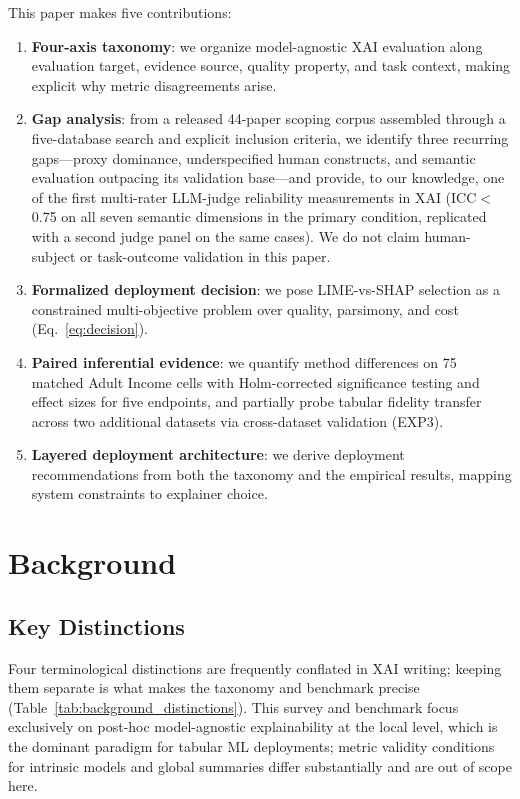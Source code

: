 \documentclass[fleqn,10pt,lineno]{wlpeerj}
\begin{document}
This paper makes five contributions:
\begin{enumerate}[leftmargin=*]
\item \textbf{Four-axis taxonomy}: we organize model-agnostic XAI
evaluation along evaluation target, evidence source, quality property,
and task context, making explicit why metric disagreements arise.
\item \textbf{Gap analysis}: from a released 44-paper scoping corpus
assembled through a five-database search and explicit inclusion criteria,
we identify three recurring gaps---proxy dominance, underspecified human constructs, and semantic
evaluation outpacing its validation base---and provide, to our
knowledge, one of the first multi-rater LLM-judge reliability measurements in
XAI (ICC$<$0.75 on all seven semantic dimensions in the primary condition,
replicated with a second judge panel on the same cases). We do not claim
human-subject or task-outcome validation in this paper.
\item \textbf{Formalized deployment decision}: we pose LIME-vs-SHAP
selection as a constrained multi-objective problem over quality, parsimony,
and cost (Eq.~\ref{eq:decision}).
\item \textbf{Paired inferential evidence}: we quantify method differences
on 75 matched Adult Income cells with Holm-corrected significance testing
and effect sizes for five endpoints, and partially probe tabular fidelity
transfer across two additional datasets via cross-dataset validation
(EXP3).
\item \textbf{Layered deployment architecture}: we derive deployment
recommendations from both the taxonomy and the empirical results, mapping
system constraints to explainer choice.
\end{enumerate}


\section{Background}
\label{sec:background}

\subsection{Key Distinctions}

Four terminological distinctions are frequently conflated in XAI writing;
keeping them separate is what makes the taxonomy and benchmark precise
(Table~\ref{tab:background_distinctions}). This survey and benchmark focus
exclusively on post-hoc model-agnostic explainability at the local level,
which is the dominant paradigm for tabular ML deployments; metric validity
conditions for intrinsic models and global summaries differ substantially
and are out of scope here.
\end{document}
